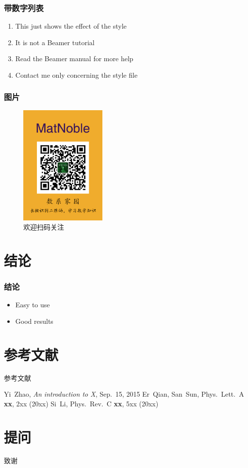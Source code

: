 \documentclass[10pt,aspectratio=43,serif]{beamer}
\begin{document}
\begin{frame}
  \frametitle{带数字列表}
	 \begin{enumerate}
	    \item This just shows the effect of the style
	    \item It is not a Beamer tutorial
	    \item Read the Beamer manual for more help
	    \item Contact me only concerning the style file
	  \end{enumerate}
\end{frame}

\begin{frame}
\frametitle{图片}
	\begin{figure}
		\includegraphics[height=6cm]{figures/logo.jpg}
		\caption{欢迎扫码关注}
    \end{figure}
\end{frame}

\section{结论}
\begin{frame}
  \frametitle{结论}

  \begin{itemize}
    \item Easy to use
    \item Good results
  \end{itemize}
\end{frame}

\section{参考文献}
\begin{frame}{参考文献}
\begin{thebibliography}{99} 
 Yi~Zhao, {\sl An introduction to X}, Sep.~15, 2015
 Er~Qian, San~Sun, 
Phys.\ Lett.\ A {\bf xx}, 2xx (20xx)   
 Si~Li, Phys.\ Rev.\ C {\bf xx}, 5xx (20xx) 

\end{thebibliography}
\end{frame}

\section{提问}
\begin{frame}{致谢}
\begin{center}
\end{center}
\end{frame}
\end{document}
